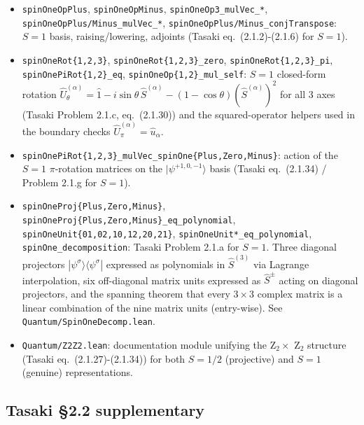\documentclass[a4paper,11pt]{article}
\begin{document}
\begin{itemize}
  relations (Tasaki eq.~(2.1.31)/(2.1.33)/(2.1.34)).
\item \texttt{spinOneOpPlus}, \texttt{spinOneOpMinus},
  \texttt{spinOneOp3\_mulVec\_*}, \texttt{spinOneOpPlus/Minus\_mulVec\_*},
  \texttt{spinOneOpPlus/Minus\_conjTranspose}: $S = 1$ basis,
  raising/lowering, adjoints (Tasaki eq.~(2.1.2)-(2.1.6) for $S=1$).
\item \texttt{spinOneRot\{1,2,3\}},
  \texttt{spinOneRot\{1,2,3\}\_zero},
  \texttt{spinOneRot\{1,2,3\}\_pi},
  \texttt{spinOnePiRot\{1,2\}\_eq},
  \texttt{spinOneOp\{1,2\}\_mul\_self}:
  $S = 1$ closed-form rotation $\hat U^{(\alpha)}_\theta = \hat 1 -
  i\sin\theta\,\hat S^{(\alpha)} - (1-\cos\theta)(\hat S^{(\alpha)})^2$
  for all 3 axes (Tasaki Problem 2.1.c, eq.~(2.1.30)) and the
  squared-operator helpers used in the boundary checks $\hat U^{(\alpha)}_\pi
  = \hat u_\alpha$.
\item \texttt{spinOnePiRot\{1,2,3\}\_mulVec\_spinOne\{Plus,Zero,Minus\}}:
  action of the $S = 1$ $\pi$-rotation matrices on the
  $|\psi^{+1,0,-1}\rangle$ basis (Tasaki eq.~(2.1.34) / Problem 2.1.g
  for $S = 1$).
\item \texttt{spinOneProj\{Plus,Zero,Minus\}},
  \texttt{spinOneProj\{Plus,Zero,Minus\}\_eq\_polynomial},
  \texttt{spinOneUnit\{01,02,10,12,20,21\}},
  \texttt{spinOneUnit*\_eq\_polynomial},
  \texttt{spinOne\_decomposition}: Tasaki Problem 2.1.a for $S = 1$.
  Three diagonal projectors $|\psi^\sigma\rangle\langle\psi^\sigma|$
  expressed as polynomials in $\hat S^{(3)}$ via Lagrange
  interpolation, six off-diagonal matrix units expressed as
  $\hat S^{\pm}$ acting on diagonal projectors, and the spanning
  theorem that every $3 \times 3$ complex matrix is a linear
  combination of the nine matrix units (entry-wise).
  See \texttt{Quantum/SpinOneDecomp.lean}.
\item \texttt{Quantum/Z2Z2.lean}: documentation module unifying the
  Z$_2 \times$ Z$_2$ structure (Tasaki eq.~(2.1.27)-(2.1.34)) for
  both $S=1/2$ (projective) and $S=1$ (genuine) representations.
\end{itemize}

\subsection{Tasaki \S2.2 supplementary}
\end{document}

